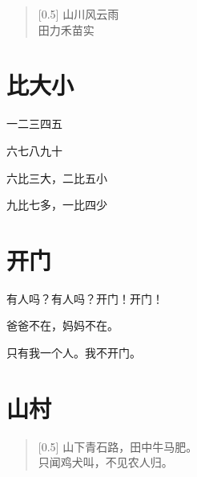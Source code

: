 \documentclass[12pt,UTF-8,openany]{ctexbook}
\begin{document}
\begin{large}
    
    \begin{verse}[0.5\linewidth]
        山川风云雨 \\
        田力禾苗实
    \end{verse}
    
\end{large}





\chapter{比大小}

\begin{large}
    
    一二三四五
    
    六七八九十
    
    六比三大，二比五小
    
    九比七多，一比四少
    
\end{large}





\chapter{开门}

\begin{large}
    
    有人吗？有人吗？开门！开门！
    
    爸爸不在，妈妈不在。
    
    只有我一个人。我不开门。
    
\end{large}





\chapter{山村}

\begin{large}
    
    \begin{verse}[0.5\linewidth]
        山下青石路，田中牛马肥。 \\
        只闻鸡犬叫，不见农人归。
    \end{verse}
    
\end{large}
\end{document}

